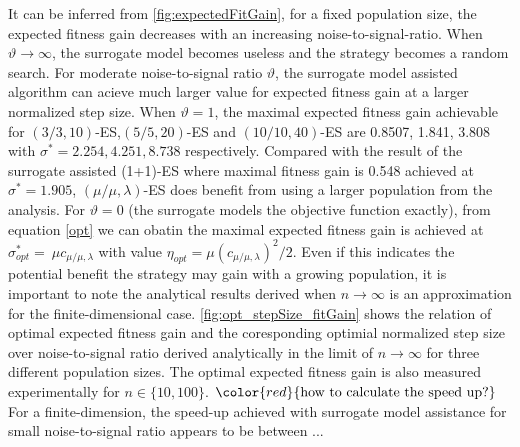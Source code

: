 It can be inferred from \ref{fig:expectedFitGain}, for a fixed population size, the expected fitness gain decreases with an increasing noise-to-signal-ratio. When $\vartheta \rightarrow \infty$, the surrogate model becomes useless and the strategy becomes a random search. For moderate noise-to-signal ratio $\vartheta$, the surrogate model assisted algorithm can acieve much larger value for expected fitness gain at a larger normalized step size. When $\vartheta = 1$, the maximal expected fitness gain achievable for $(3/3,10)$-ES,$(5/5,20)$-ES and $(10/10,40)$-ES are 0.8507, 1.841, 3.808 with $\sigma^*=2.254,4.251,8.738$ respectively. Compared with the result of the surrogate assisted (1+1)-ES \cite{DBLP:conf/ppsn/KayhaniA18} where maximal fitness gain is 0.548 achieved at $\sigma^* = 1.905$, $(\mu/\mu,\lambda)$-ES does benefit from using a larger population from the analysis. For $\vartheta=0$ (the surrogate models the objective function exactly), from equation \ref{opt} we can obatin the maximal expected fitness gain is achieved at $\sigma^*_{opt} = \ \mu c_{\mu / \mu, \lambda}$ with value $\eta_{opt} =  \mu (c_{\mu / \mu, \lambda})^2/2$. Even if this indicates the potential benefit the strategy may gain with a growing population, it is important to note the analytical results derived when $n \rightarrow \infty$ is an approximation for the finite-dimensional case. \ref{fig:opt_stepSize_fitGain} shows the relation of optimal expected fitness gain and the coresponding optimial normalized step size over noise-to-signal ratio derived analytically in the limit of $n \rightarrow \infty$ for three different population sizes. The optimal expected fitness gain is also measured experimentally for $n \in \{10,100 \}$. 
$\color{red}{\text{how to calculate the speed up?}}$
For a finite-dimension, the speed-up achieved with surrogate model assistance for small noise-to-signal ratio appears to be between ...






